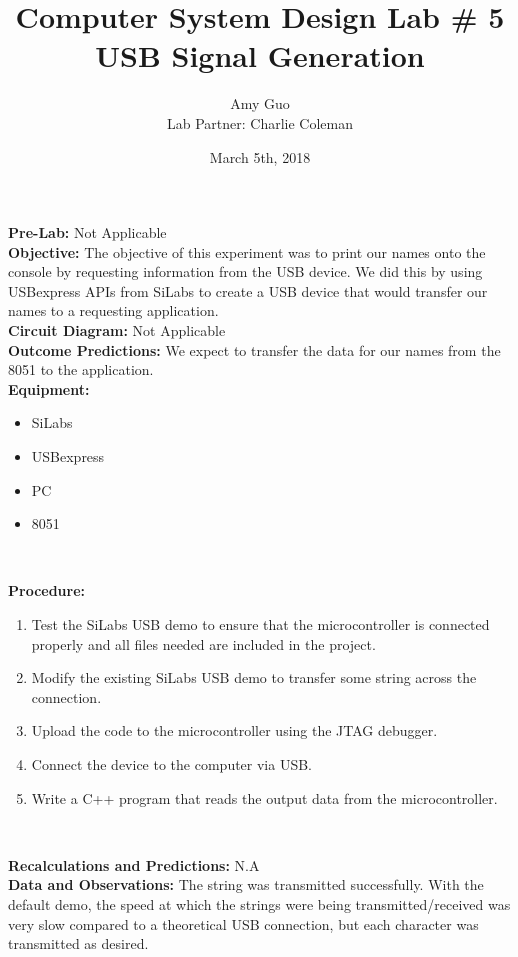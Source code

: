 \documentclass{article}
\title{Computer System Design Lab \# 5\\USB Signal Generation}
\author{Amy Guo \\ Lab Partner: Charlie Coleman}
\date{March 5th, 2018}
\newcommand{\sect}[1]{\noindent\textbf{#1}}
\begin{document}
\maketitle
\pagebreak

\sect{Pre-Lab:} Not Applicable\\

\sect{Objective:} The objective of this experiment was to print our names onto the console by requesting information from the USB device. We did this by using USBexpress APIs from SiLabs to create a USB device that would transfer our names to a requesting application.\\

\sect{Circuit Diagram:} Not Applicable\\

\sect{Outcome Predictions:} We expect to transfer the data for our names from the 8051 to the application.\\

\sect{Equipment:}

\begin{itemize}[noitemsep, nolistsep]
	\item SiLabs
	\item USBexpress
	\item PC
	\item 8051
\end{itemize}~

\sect{Procedure:}

\begin{enumerate}
	\item Test the SiLabs USB demo to ensure that the microcontroller is connected properly and all files needed are included in the project.
	\item Modify the existing SiLabs USB demo to transfer some string across the connection.
	\item Upload the code to the microcontroller using the JTAG debugger.
	\item Connect the device to the computer via USB.
	\item Write a C++ program that reads the output data from the microcontroller.
\end{enumerate}~

\sect{Recalculations and Predictions:} N.A\\

\sect{Data and Observations:} The string was transmitted successfully. With the default demo, the speed at which the strings were being transmitted/received was very slow compared to a theoretical USB connection, but each character was transmitted as desired.\\
\end{document}
